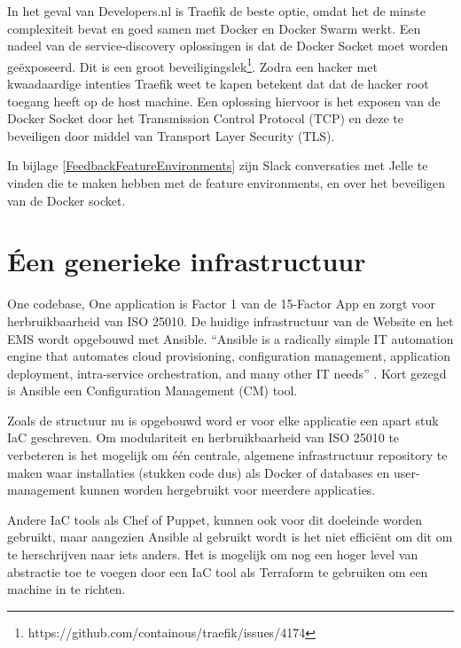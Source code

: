 In het geval van Developers.nl is Traefik de beste optie, omdat het de minste complexiteit bevat en goed samen met Docker en Docker Swarm werkt. Een nadeel van de service-discovery oplossingen is dat de Docker Socket moet worden geëxposeerd. Dit is een groot beveiligingslek\footnote{https://github.com/containous/traefik/issues/4174}. Zodra een hacker met kwaadaardige intenties Traefik weet te kapen betekent dat dat de hacker root toegang heeft op de host machine. Een oplossing hiervoor is het exposen van de Docker Socket door het Transmission Control Protocol (TCP) en deze te beveiligen door middel van Transport Layer Security (TLS).

In bijlage \ref{FeedbackFeatureEnvironments} zijn Slack conversaties met Jelle te vinden die te maken hebben met de feature environments, en over het beveiligen van de Docker socket.

\section{Éen generieke infrastructuur}
One codebase, One application is Factor 1 van de 15-Factor App en zorgt voor herbruikbaarheid van ISO 25010. De huidige infrastructuur van de Website en het EMS wordt opgebouwd met Ansible. \enquote{Ansible is a radically simple IT automation engine that automates cloud provisioning, configuration management, application deployment, intra-service orchestration, and many other IT needs} \parencite{Ansible}. Kort gezegd is Ansible een Configuration Management (CM) tool.

Zoals de structuur nu is opgebouwd word er voor elke applicatie een apart stuk IaC geschreven. Om modulariteit en herbruikbaarheid van ISO 25010 \parencite{ISO25010} te verbeteren is het mogelijk om één centrale, algemene infrastructuur repository te maken waar installaties (stukken code dus) als Docker of databases en user-management kunnen worden hergebruikt voor meerdere applicaties. 

Andere IaC tools als Chef of Puppet, kunnen ook voor dit doeleinde worden gebruikt, maar aangezien Ansible al gebruikt wordt is het niet efficiënt om dit om te herschrijven naar iets anders. Het is mogelijk om nog een hoger level van abstractie toe te voegen door een IaC tool als Terraform te gebruiken om een machine in te richten.

